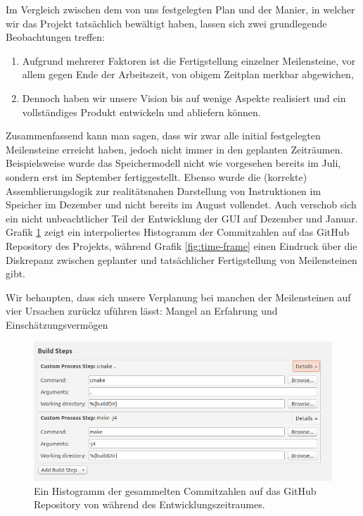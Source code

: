 Im Vergleich zwischen dem von uns festgelegten Plan und der Manier, in welcher wir das Projekt tatsächlich bewältigt haben, lassen sich zwei grundlegende Beobachtungen treffen:
\vspace{-0.2cm}
\begin{enumerate}
  \item Aufgrund mehrerer Faktoren ist die Fertigstellung einzelner Meilensteine, vor allem gegen Ende der Arbeitszeit, von obigem Zeitplan merkbar abgewichen,
  \item Dennoch haben wir unsere Vision bis auf wenige Aspekte realisiert und ein vollständiges Produkt entwickeln und abliefern können.
\end{enumerate}

Zusammenfassend kann man sagen, dass wir zwar alle initial festgelegten
Meilensteine erreicht haben, jedoch nicht immer in den geplanten Zeiträumen.
Beispielsweise wurde das Speichermodell nicht wie vorgesehen bereits im Juli,
sondern erst im September fertiggestellt. Ebenso wurde die (korrekte)
Assemblierungslogik zur realitätsnahen Darstellung von Instruktionen im Speicher
im Dezember und nicht bereits im August vollendet. Auch verschob sich ein nicht
unbeachtlicher Teil der Entwicklung der GUI auf Dezember und Januar. Grafik
\ref{fig:commit-history} zeigt ein interpoliertes Histogramm der Commitzahlen
auf das GitHub Repository des Projekts, während Grafik \ref{fig:time-frame}
einen Eindruck über die Diskrepanz zwischen geplanter und tatsächlicher
Fertigstellung von Meilensteinen gibt.

Wir behaupten, dass sich unsere Verplanung bei manchen der Meilensteinen auf vier Ursachen zurückz uführen lässt: Mangel an Erfahrung und Einschätzungsvermögen

\begin{figure}[p!]
  \includegraphics[scale=0.1]{figures/commit-history}
  \caption{Ein Histogramm der gesammelten Commitzahlen auf das GitHub Repository von \erasim{} während des Entwicklungszeitraumes.}
  \label{fig:commit-history}
\end{figure}


